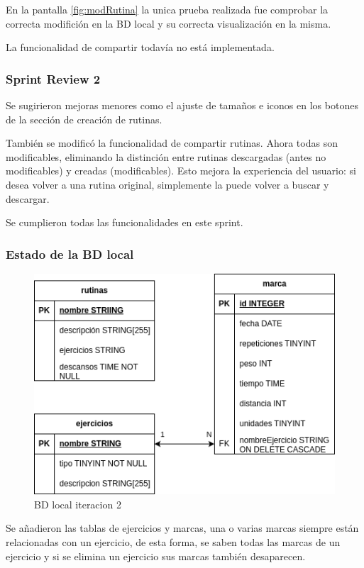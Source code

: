 En la pantalla \cref{fig:modRutina} la unica prueba realizada fue comprobar la correcta modifición en la BD local y su correcta visualización en la misma.

La funcionalidad de compartir todavía no está implementada.

\subsubsection{Sprint Review 2}
Se sugirieron mejoras menores como el ajuste de tamaños e iconos en los botones de la sección de creación de rutinas.

También se modificó la funcionalidad de compartir rutinas. Ahora todas son modificables, eliminando la distinción entre rutinas descargadas (antes no modificables) y creadas (modificables). Esto mejora la experiencia del usuario: si desea volver a una rutina original, simplemente la puede volver a buscar y descargar.

Se cumplieron todas las funcionalidades en este sprint.

\subsubsection{Estado de la BD local}

\begin{figure}[H]
   \centering
    \includegraphics[width=\textwidth]{fotos/BDL iteracion 2.png}
    \caption{BD local iteracion 2}
    \label{fig:BD local iteracion 2}
\end{figure}

Se añadieron las tablas de ejercicios y marcas, una o varias marcas siempre están relacionadas con un ejercicio, de esta forma, se saben todas las marcas de un ejercicio y si se elimina un ejercicio sus marcas también desaparecen.

